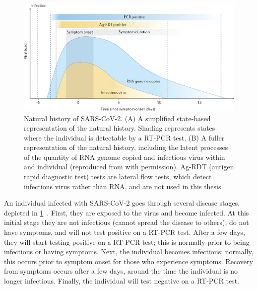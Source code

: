 \documentclass[thesis.tex]{subfiles}
\begin{document}
\begin{figure}
{
  }
  \centering\includegraphics[width=\textwidth]{biology-data/natural-history}
  \caption[Natural history of SARS-CoV-2.]{%
    Natural history of SARS-CoV-2.
    (A) A simplified state-based representation of the natural history.
    Shading represents states where the individual is detectable by a RT-PCR test.
    (B) A fuller representation of the natural history, including the latent processes of the quantity of RNA genome copied and infectious virus within and individual (reproduced from \textcite{puhachSARSCoV2} with permission).
    Ag-RDT (antigen rapid diagnostic test) tests are lateral flow tests, which detect infectious virus rather than RNA, and are not used in this thesis.
  }
  \label{biology-data:fig:natural-history}
\end{figure}

An individual infected with SARS-CoV-2 goes through several disease stages, depicted in \cref{biology-data:fig:natural-history}~\autocite{puhachSARSCoV2}.
First, they are exposed to the virus and become infected.
At this initial stage they are not infectious (cannot spread the disease to others), do not have symptoms, and will not test positive on a RT-PCR test.
After a few days, they will start testing positive on a RT-PCR test; this is normally prior to being infectious or having symptoms.
Next, the individual becomes infectious; normally, this occurs prior to symptom onset for those who experience symptoms.
Recovery from symptoms occurs after a few days, around the time the individual is no longer infectious.
Finally, the individual will test negative on a RT-PCR test.
\end{document}
